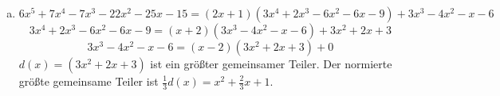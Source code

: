 \documentclass[a4paper]{scrartcl}
\begin{document}
\begin{enumerate}
\begin{enumerate}[a)]
\item
\[6x^5  + 7x^4 - 7x^3 - 22x^2 - 25x - 15 = (2x+1)(3x^4 + 2x^3 - 6x^2 - 6x - 9)+3x^3-4x^2-x-6\]
\[3x^4 + 2x^3 - 6x^2 - 6x - 9 = (x+2)(3x^3-4x^2-x-6)+3x^2+2x+3\]
\[3x^3-4x^2-x-6 = (x-2)(3x^2+2x+3)+0\]
\(d(x) = (3x^2+2x+3)\) ist ein größter gemeinsamer Teiler. Der normierte
größte gemeinsame Teiler ist \(\frac 1 3 d(x) = x^2+\frac 2 3 x + 1\).

\end{enumerate}
\end{enumerate}
\end{document}
